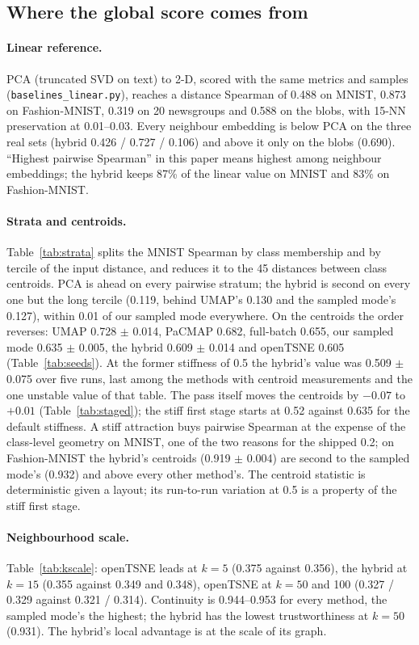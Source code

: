 \documentclass[11pt]{article}
\begin{document}
\subsection{Where the global score comes from}\label{sec:global}
\paragraph{Linear reference.} PCA (truncated SVD on text) to 2-D, scored with the same metrics and
samples (\texttt{baselines\_linear.py}), reaches a distance Spearman of 0.488 on MNIST, 0.873 on
Fashion-MNIST, 0.319 on 20 newsgroups and 0.588 on the blobs, with 15-NN preservation at 0.01--0.03.
Every neighbour embedding is below PCA on the three real sets (hybrid 0.426 / 0.727 / 0.106) and above
it only on the blobs (0.690). ``Highest pairwise Spearman'' in this paper means highest among neighbour
embeddings; the hybrid keeps 87\% of the linear value on MNIST and 83\% on Fashion-MNIST.

\paragraph{Strata and centroids.} Table~\ref{tab:strata} splits the MNIST Spearman by class membership
and by tercile of the input distance, and reduces it to the 45 distances between class centroids. PCA
is ahead on every pairwise stratum; the hybrid is second on every one but the long tercile (0.119, behind
UMAP's 0.130 and the sampled mode's 0.127), within 0.01 of our sampled mode everywhere. On the centroids the order
reverses: UMAP 0.728 $\pm$ 0.014, PaCMAP
0.682, full-batch 0.655, our sampled mode 0.635 $\pm$ 0.005, the hybrid 0.609 $\pm$ 0.014 and openTSNE 0.605
(Table~\ref{tab:seeds}). At the former stiffness of 0.5 the hybrid's value was 0.509 $\pm$ 0.075 over five runs,
last among the methods with centroid measurements and the one unstable value of that table. The
pass itself moves the centroids by $-0.07$ to $+0.01$ (Table~\ref{tab:staged}); the stiff first stage
starts at 0.52 against 0.635 for the default stiffness. A stiff attraction buys pairwise Spearman at
the expense of the class-level geometry on MNIST, one of the two reasons for the shipped 0.2; on Fashion-MNIST the
hybrid's centroids (0.919 $\pm$ 0.004) are second to the sampled mode's (0.932) and above every other method's. The centroid statistic is
deterministic given a layout; its run-to-run variation at 0.5 is a property of the stiff first stage.

\paragraph{Neighbourhood scale.} Table~\ref{tab:kscale}: openTSNE leads at $k = 5$ (0.375 against
0.356), the hybrid at $k = 15$ (0.355 against 0.349 and 0.348), openTSNE at $k = 50$ and 100 (0.327 / 0.329 against
0.321 / 0.314). Continuity is 0.944--0.953 for every method, the sampled mode's the highest; the hybrid
has the lowest trustworthiness at $k = 50$ (0.931). The
hybrid's local advantage is at the scale of its graph.
\end{document}
